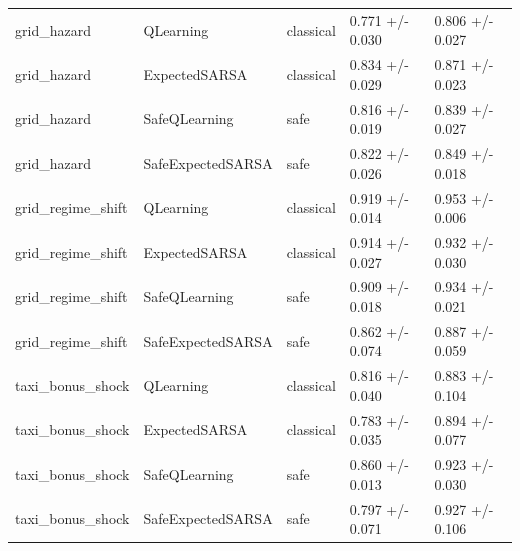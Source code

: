 \begin{tabular}{lllll}
grid_hazard & QLearning & classical & 0.771 +/- 0.030 & 0.806 +/- 0.027 \\
grid_hazard & ExpectedSARSA & classical & 0.834 +/- 0.029 & 0.871 +/- 0.023 \\
grid_hazard & SafeQLearning & safe & 0.816 +/- 0.019 & 0.839 +/- 0.027 \\
grid_hazard & SafeExpectedSARSA & safe & 0.822 +/- 0.026 & 0.849 +/- 0.018 \\
grid_regime_shift & QLearning & classical & 0.919 +/- 0.014 & 0.953 +/- 0.006 \\
grid_regime_shift & ExpectedSARSA & classical & 0.914 +/- 0.027 & 0.932 +/- 0.030 \\
grid_regime_shift & SafeQLearning & safe & 0.909 +/- 0.018 & 0.934 +/- 0.021 \\
grid_regime_shift & SafeExpectedSARSA & safe & 0.862 +/- 0.074 & 0.887 +/- 0.059 \\
taxi_bonus_shock & QLearning & classical & 0.816 +/- 0.040 & 0.883 +/- 0.104 \\
taxi_bonus_shock & ExpectedSARSA & classical & 0.783 +/- 0.035 & 0.894 +/- 0.077 \\
taxi_bonus_shock & SafeQLearning & safe & 0.860 +/- 0.013 & 0.923 +/- 0.030 \\
taxi_bonus_shock & SafeExpectedSARSA & safe & 0.797 +/- 0.071 & 0.927 +/- 0.106 \\
\bottomrule
\end{tabular}
